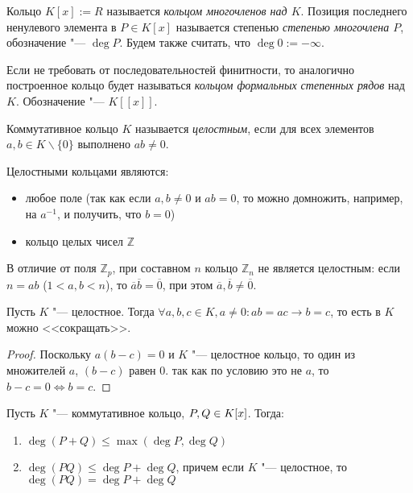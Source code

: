 \begin{definition}
	Кольцо $K[x] := R$ называется \textit{кольцом многочленов над $K$}. Позиция последнего ненулевого элемента в $P \in K[x]$ называется степенью \textit{степенью многочлена $P$}, обозначение "--- $\deg{P}$. Будем также считать, что $\deg{0} := -\infty$.
\end{definition}

\begin{note}
	Если не требовать от последовательностей финитности, то аналогично построенное кольцо будет называться \textit{кольцом формальных степенных рядов} над $K$. Обозначение "--- $K[[x]]$.
\end{note}

\begin{definition}
	Коммутативное кольцо $K$ называется \textit{целостным}, если для всех элементов $a, b \in K \backslash \{0\}$ выполнено $ab \ne 0$.
\end{definition}

\begin{example}
	Целостными кольцами являются:
	\begin{itemize}
		\item любое поле (так как если $a, b \ne 0$ и $ab = 0$, то можно домножить, например, на $a^{-1}$, и получить, что $b = 0$)
		\item кольцо целых чисел $\mathbb{Z}$
	\end{itemize}
	
	В отличие от поля $\mathbb{Z}_p$, при составном $n$ кольцо $\mathbb{Z}_n$ не является целостным: если $n = ab$ ($1 < a, b < n$), то $\overline{a}\overline{b} = \overline{0}$, при этом $\overline{a}, \overline{b} \ne \overline{0}$.
\end{example}

\begin{proposition}
	Пусть $K$ "--- целостное. Тогда $\forall a, b, c \in K, a \ne 0: ab = ac \rightarrow b = c$, то есть в $K$ можно <<сокращать>>.
\end{proposition}

\begin{proof}
	Поскольку $a(b - c) = 0$ и $K$ "--- целостное кольцо, то один из множителей $a$, $(b - c)$ равен $0$. так как по условию это не $a$, то $b - c = 0 \Leftrightarrow b = c$.
\end{proof}

\begin{proposition}
	Пусть $K$ "--- коммутативное кольцо, $P, Q \hm{\in} K[x]$. Тогда:
	\begin{enumerate}
		\item $\deg{(P + Q)} \le \max(\deg{P}, \deg{Q})$
		\item $\deg{(PQ)} \le \deg{P} + \deg{Q}$, причем если $K$ "--- целостное, то $\deg{(PQ)} = \deg{P} + \deg{Q}$
	\end{enumerate}
\end{proposition}

